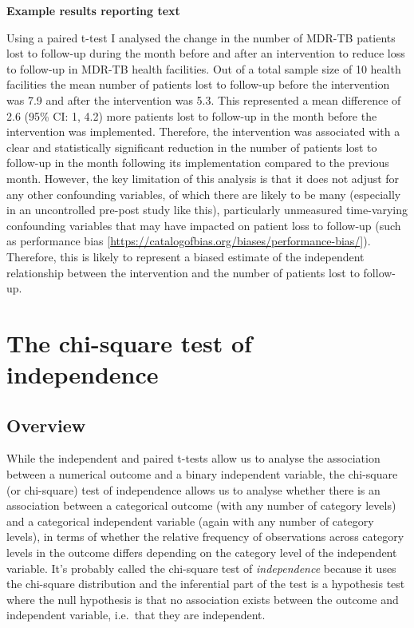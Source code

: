 \documentclass[
]{book}
\begin{document}
\textbf{Example results reporting text}

Using a paired t-test I analysed the change in the number of MDR-TB patients lost to follow-up during the month before and after an intervention to reduce loss to follow-up in MDR-TB health facilities. Out of a total sample size of 10 health facilities the mean number of patients lost to follow-up before the intervention was 7.9 and after the intervention was 5.3. This represented a mean difference of 2.6 (95\% CI: 1, 4.2) more patients lost to follow-up in the month before the intervention was implemented. Therefore, the intervention was associated with a clear and statistically significant reduction in the number of patients lost to follow-up in the month following its implementation compared to the previous month. However, the key limitation of this analysis is that it does not adjust for any other confounding variables, of which there are likely to be many (especially in an uncontrolled pre-post study like this), particularly unmeasured time-varying confounding variables that may have impacted on patient loss to follow-up (such as performance bias {[}\url{https://catalogofbias.org/biases/performance-bias/}{]}). Therefore, this is likely to represent a biased estimate of the independent relationship between the intervention and the number of patients lost to follow-up.

\hypertarget{the-chi-square-test-of-independence}{%
\chapter{The chi-square test of independence}\label{the-chi-square-test-of-independence}}

\hypertarget{overview-13}{%
\section{Overview}\label{overview-13}}

While the independent and paired t-tests allow us to analyse the association between a numerical outcome and a binary independent variable, the chi-square (or chi-square) test of independence allows us to analyse whether there is an association between a categorical outcome (with any number of category levels) and a categorical independent variable (again with any number of category levels), in terms of whether the relative frequency of observations across category levels in the outcome differs depending on the category level of the independent variable. It's probably called the chi-square test of \emph{independence} because it uses the chi-square distribution and the inferential part of the test is a hypothesis test where the null hypothesis is that no association exists between the outcome and independent variable, i.e.~that they are independent.
\end{document}
